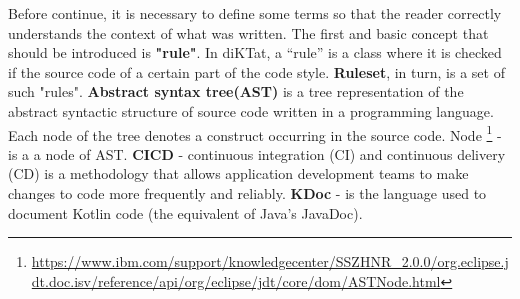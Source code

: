 Before continue, it is necessary to define some terms so that the reader correctly understands the context of what was written. The first and basic concept that should be introduced is \textbf{"rule"}. In diKTat, a “rule” is a class where it is checked if the source code of a certain part of the code style. \textbf{Ruleset}, in turn, is a set of such "rules". \textbf{Abstract syntax tree(AST)} is a tree representation of the abstract syntactic structure of source code written in a programming language. Each node of the tree denotes a construct occurring in the source code. Node \footnote{\url{ https://www.ibm.com/support/knowledgecenter/SSZHNR_2.0.0/org.eclipse.jdt.doc.isv/reference/api/org/eclipse/jdt/core/dom/ASTNode.html}} - is a a node of AST. \textbf{CICD} - continuous integration (CI) and continuous delivery (CD) is a methodology that allows application development teams to make changes to code more frequently and reliably. \textbf{KDoc} - is the language used to document Kotlin code (the equivalent of Java's JavaDoc).